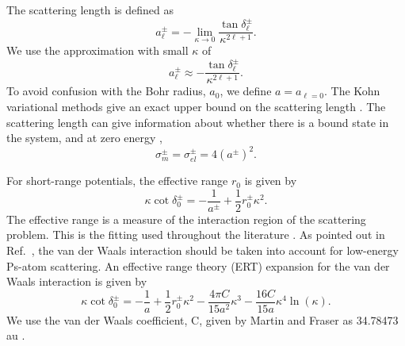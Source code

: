 \documentclass[preprint,showpacs,showkeys,preprintnumbers,amsmath,amssymb,longbibliography,pra,aps]{revtex4-1}
\begin{document}
The scattering length is defined as \cite{Bransden2003}
\begin{equation}
\label{eq:ScatLen}
a_\ell^\pm = -\lim_{\kappa \to 0}
  \frac{\tan{\delta_\ell^\pm}}{\kappa^{2\ell+1}}.
\end{equation}
We use the approximation with small $\kappa$ of
\begin{equation}
\label{eq:ScatLenApprox}
a_\ell^\pm \approx
  - \frac{\tan{\delta_\ell^\pm}}{\kappa^{2\ell+1}}.
\end{equation}
To avoid confusion with the Bohr radius, $a_0$, we define $a = a_{\ell=0}$. The
Kohn variational methods give an exact upper bound on the scattering length
\cite{Joachain1979}. The scattering length can give information about whether
there is a bound state in the system, and at zero energy \cite{Buckman1989},
\begin{equation}
\label{eq:ScatLenCross}
\sigma_m^\pm = \sigma_{el}^\pm = 4 (a^\pm)^2 .
\end{equation}

For short-range potentials, the effective range $r_0$ is given by
\cite{Bethe1949,Blatt1949}
\begin{equation}
\label{eq:EffectiveRangeShort}
\kappa \cot\delta_0^\pm = -\frac{1}{a^\pm} + \frac{1}{2} r_0^\pm \kappa^2.
\end{equation}
The effective range is a measure of the interaction region of the scattering
problem. This is the fitting used throughout the literature
\cite{Ivanov2002,VanReeth2003,Blackwood2002,Walters2004}. As pointed out in
Ref.~\cite{Fabrikant2014}, the van der Waals interaction should be taken into
account for low-energy Ps-atom scattering. An effective range theory (ERT)
expansion for the van der Waals interaction is given by \cite{Drake2006}
\begin{equation}
\label{eq:EffectiveRangeLongAu}
\kappa \cot\delta_0^\pm = -\frac{1}{a} + \frac{1}{2} r_0^\pm \kappa^2 - 
  \frac{4 \pi C}{15 a^2} \kappa^3 - 
  \frac{16 C}{15 a} \kappa^4 \ln \left(\kappa \right).
\end{equation}
We use the van der Waals coefficient, C, given by Martin and Fraser as
34.78473 au \cite{Martin1980}.
\end{document}
